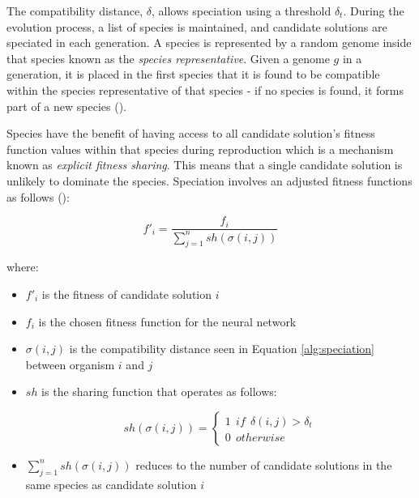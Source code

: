 \parbreak\noindent The compatibility distance, $\delta$, allows speciation using a threshold $\delta_t$. During the evolution process, a list of species is maintained, and candidate solutions are speciated in each generation. A species is represented by a random genome inside that species known as the \textit{species representative}. Given a genome $g$ in a generation, it is placed in the first species that it is found to be compatible within the species representative of that species - if no species is found, it forms part of a new species (\cite{stanley2002evolving}).

\parbreak\noindent Species have the benefit of having access to all candidate solution's fitness function values within that species during reproduction which is a mechanism known as \textit{explicit fitness sharing}. This means that a single candidate solution is unlikely to dominate the species. Speciation involves an adjusted fitness functions as follows (\cite{stanley2002evolving}):
\begin{ceqn}
    \begin{equation}\label{alg:speciation}
        f'_i = \frac{f_i}{\sum_{j=1}^{n}sh(\sigma(i,j))}
    \end{equation}
\end{ceqn}

\noindent where:
\begin{itemize}
    \item $f'_i$ is the fitness of candidate solution $i$
    \item $f_i$ is the chosen fitness function for the neural network
    \item $\sigma(i,j)$ is the compatibility distance seen in Equation \ref{alg:speciation} between organism $i$ and $j$
    \item $sh$ is the sharing function that operates as follows:
    \begin{ceqn}
        \begin{equation}\label{alg:sharing_function}
            sh(\sigma(i,j)) = 
            \begin{cases} 
                1 \:\: if \:\: \delta(i,j) > \delta_t \\
                0 \:\: otherwise
            \end{cases}
        \end{equation}
    \end{ceqn}

    \item $\sum_{j=1}^{n}sh(\sigma(i,j))$ reduces to the number of candidate solutions in the same species as candidate solution $i$
\end{itemize}

